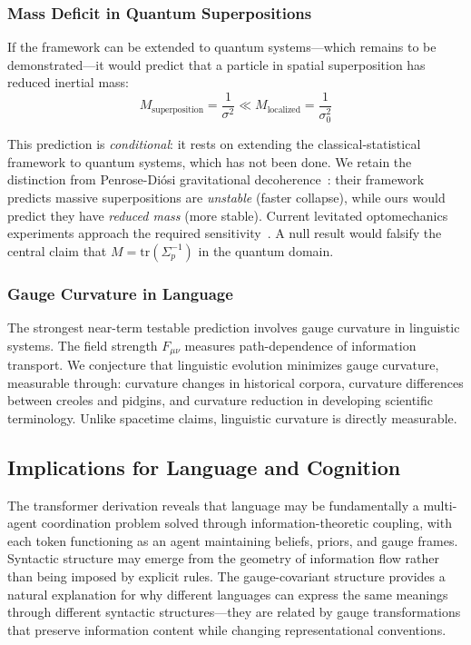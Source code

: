 \documentclass[11pt]{article}
\begin{document}
\subsubsection{Mass Deficit in Quantum Superpositions}

If the framework can be extended to quantum systems---which remains to be demonstrated---it would predict that a particle in spatial superposition has reduced inertial mass:
\begin{equation}
M_{\mathrm{superposition}} = \frac{1}{\sigma^2} \ll M_{\mathrm{localized}} = \frac{1}{\sigma_0^2}
\end{equation}

This prediction is \emph{conditional}: it rests on extending the classical-statistical framework to quantum systems, which has not been done. We retain the distinction from Penrose-Di\'osi gravitational decoherence~\cite{Penrose1996}: their framework predicts massive superpositions are \emph{unstable} (faster collapse), while ours would predict they have \emph{reduced mass} (more stable). Current levitated optomechanics experiments approach the required sensitivity~\cite{Bateman2014,Millen2020}. A null result would falsify the central claim that $M = \mathrm{tr}(\Sigma_p^{-1})$ in the quantum domain.

\subsubsection{Gauge Curvature in Language}

The strongest near-term testable prediction involves gauge curvature in linguistic systems. The field strength $F_{\mu\nu}$ measures path-dependence of information transport. We conjecture that linguistic evolution minimizes gauge curvature, measurable through: curvature changes in historical corpora, curvature differences between creoles and pidgins, and curvature reduction in developing scientific terminology. Unlike spacetime claims, linguistic curvature is directly measurable.

\subsection{Implications for Language and Cognition}

The transformer derivation reveals that language may be fundamentally a multi-agent coordination problem solved through information-theoretic coupling, with each token functioning as an agent maintaining beliefs, priors, and gauge frames. Syntactic structure may emerge from the geometry of information flow rather than being imposed by explicit rules. The gauge-covariant structure provides a natural explanation for why different languages can express the same meanings through different syntactic structures---they are related by gauge transformations that preserve information content while changing representational conventions.
\end{document}

